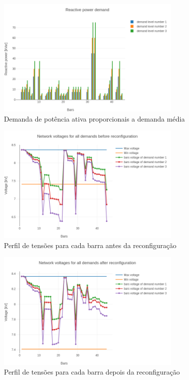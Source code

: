 \begin{figure}[H]
    \centering
    \includegraphics[width=0.8\textwidth]{7_Results/img/45demand_reactive.png}
    \caption{Demanda de potência ativa proporcionais a demanda média}
    \label{fig:45demandreactive_propor}
\end{figure}

\begin{figure}[H]
    \centering
    \includegraphics[width=0.8\textwidth]{7_Results/img/45voltages_before.png}
    \caption{Perfil de tensões para cada barra antes da reconfiguração}
    \label{fig:45voltages_beforesprop}
\end{figure}

\begin{figure}[H]
    \centering
    \includegraphics[width=0.8\textwidth]{7_Results/img/45voltages_after.png}
    \caption{Perfil de tensões para cada barra depois da reconfiguração}
    \label{fig:45voltaes_afterprop}
\end{figure}

